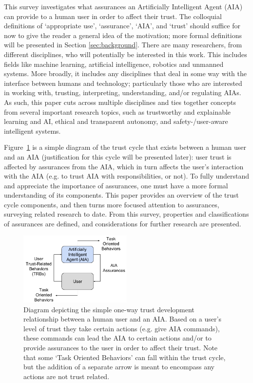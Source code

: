 This survey investigates what assurances an Artificially Intelligent Agent (AIA) can provide to a human user in order to affect their trust. The colloquial definitions of `appropriate use', `assurance', `AIA', and `trust' should suffice for now to give the reader a general idea of the motivation; more formal definitions will be presented in Section \ref{sec:background}. There are many researchers, from different disciplines, who will potentially be interested in this work. This includes fields like machine learning, artificial intelligence, robotics and unmanned systems. More broadly, it includes any disciplines that deal in some way with the interface between humans and technology; particularly those who are interested in working with, trusting, interpreting, understanding, and/or regulating AIAs. As such, this paper cuts across multiple disciplines and ties together concepts from several important research topics, such as trustworthy and explainable learning and AI, ethical and transparent autonomy, and safety-/user-aware intelligent systems.

    Figure~\ref{fig:SimpleTrust_one_way} is a simple diagram of the trust cycle that exists between a human user and an AIA (justification for this cycle will be presented later): user trust is affected by assurances from the AIA, which in turn affects the user's interaction with the AIA (e.g. to trust AIA with responsibilities, or not). To fully understand and appreciate the importance of assurances, one must have a more formal understanding of its components. This paper provides an overview of the trust cycle components, and then turns more focused attention to assurances, surveying related research to date. From this survey, properties and classifications of assurances are defined, and considerations for further research are presented.

    \begin{figure}
        \centering
        \includegraphics[width=0.5\textwidth]{Figures/SimpleTrust_one_way}
        \caption{Diagram depicting the simple one-way trust development relationship between a human user and an AIA. Based on a user's level of trust they take certain actions (e.g. give AIA commands), these commands can lead the AIA to certain actions and/or to provide assurances to the user in order to affect their trust. Note that some `Task Oriented Behaviors' can fall within the trust cycle, but the addition of a separate arrow is meant to encompass any actions are not trust related.}
        \label{fig:SimpleTrust_one_way}
    \end{figure}

